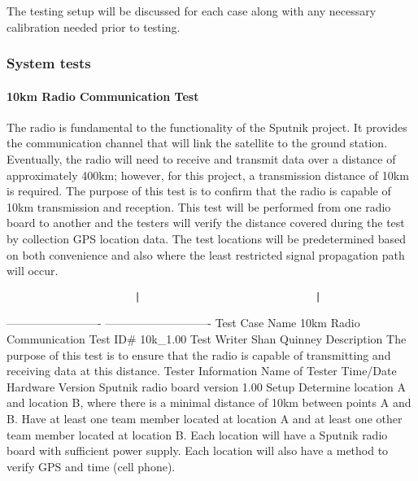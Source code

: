\documentclass[]{article}
\let\oldparagraph\paragraph
\renewcommand{\paragraph}[1]{\oldparagraph{#1}\mbox{}}
\begin{document}
The testing setup will be discussed for each case along with any
necessary calibration needed prior to testing.

\subsubsection{System tests}\label{system-tests}

\paragraph{10km Radio Communication
Test}\label{km-radio-communication-test}

The radio is fundamental to the functionality of the Sputnik project. It
provides the communication channel that will link the satellite to the
ground station. Eventually, the radio will need to receive and transmit
data over a distance of approximately 400km; however, for this project,
a transmission distance of 10km is required. The purpose of this test is
to confirm that the radio is capable of 10km transmission and reception.
This test will be performed from one radio board to another and the
testers will verify the distance covered during the test by collection
GPS location data. The test locations will be predetermined based on
both convenience and also where the least restricted signal propagation
path will occur.

\begin{verbatim}
                      |                              |
\end{verbatim}

------------------------- \textbar{} ----------------------------
\textbar{} Test Case Name \textbar{} 10km Radio Communication \textbar{}
Test ID\# \textbar{} 10k\_1.00 \textbar{} Test Writer \textbar{} Shan
Quinney \textbar{} Description \textbar{} The purpose of this test is to
ensure that the radio is capable of transmitting and receiving data at
this distance. \textbar{} Tester Information \textbar{} \textbar{} Name
of Tester \textbar{} \textbar{} Time/Date \textbar{} \textbar{} Hardware
Version \textbar{} Sputnik radio board version 1.00 \textbar{} Setup
\textbar{} Determine location A and location B, where there is a minimal
distance of 10km between points A and B. Have at least one team member
located at location A and at least one other team member located at
location B. Each location will have a Sputnik radio board with
sufficient power supply. Each location will also have a method to verify
GPS and time (cell phone). \textbar{}
\end{document}
